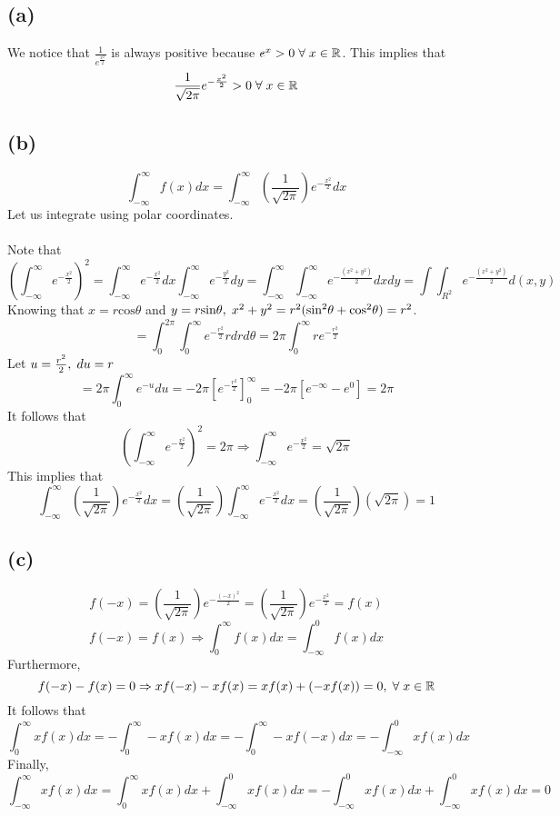 \documentclass[11pt]{article}
\begin{document}
\subsection*{(a)}
We notice that $\frac{1}{e^{\frac{x^2}{2}}}$ is always positive because $e^x>0\hspace{1mm}\forall\hspace{1mm}x\in\mathbb{R}$. This implies that
\[\frac{1}{\sqrt{2\pi}}e^{-\frac{x^2}{2}}>0\hspace{1mm}\forall\hspace{1mm}x\in\mathbb{R}\]
\subsection*{(b)}
\[\int_{-\infty}^{\infty}f(x)dx=\int_{-\infty}^{\infty}\left(\frac{1}{\sqrt{2\pi}}\right)e^{-\frac{x^2}{2}}dx\]
Let us integrate using polar coordinates. \\ \\
Note that
\[\left(\int_{-\infty}^{\infty}e^{-\frac{x^2}{2}}\right)^2=\int_{-\infty}^{\infty}e^{-\frac{x^2}{2}}dx\int_{-\infty}^{\infty}e^{-\frac{y^2}{2}}dy=\int_{-\infty}^{\infty}\int_{-\infty}^{\infty}e^{-\frac{(x^2+y^2)}{2}}dxdy=\int\int_{R^2}e^{-\frac{(x^2+y^2)}{2}}d(x,y)\]
Knowing that $x=r\text{cos}\theta$ and $y=r\text{sin}\theta,\hspace{1mm}x^2+y^2=r^2(\text{sin}^2\theta+\text{cos}^2\theta)=r^2$.
\[=\int_0^{2\pi}\int_0^{\infty}e^{-\frac{r^2}{2}}rdrd\theta=2\pi\int_0^{\infty}re^{-\frac{r^2}{2}}\]
Let $u=\frac{r^2}{2},\hspace{1mm}du=r$
\[=2\pi\int_0^{\infty}e^{-u}du=-2\pi\left[e^{-\frac{r^2}{2}}\right]_0^{\infty}=-2\pi\left[e^{-\infty}-e^0\right]=2\pi\]
It follows that 
\[\left(\int_{-\infty}^{\infty}e^{-\frac{x^2}{2}}\right)^2=2\pi\Rightarrow\int_{-\infty}^{\infty}e^{-\frac{x^2}{2}}=\sqrt{2\pi}\]
This implies that
\[\int_{-\infty}^{\infty}\left(\frac{1}{\sqrt{2\pi}}\right)e^{-\frac{x^2}{2}}dx=\left(\frac{1}{\sqrt{2\pi}}\right)\int_{-\infty}^{\infty}e^{-\frac{x^2}{2}}dx=\left(\frac{1}{\sqrt{2\pi}}\right)\left(\sqrt{2\pi}\right)=1\]
\subsection*{(c)}
\[f(-x)=\left(\frac{1}{\sqrt{2\pi}}\right)e^{-\frac{(-x)^2}{2}}=\left(\frac{1}{\sqrt{2\pi}}\right)e^{-\frac{x^2}{2}}=f(x)\]
\[f(-x)=f(x)\Rightarrow\int_0^{\infty}f(x)dx=\int_{-\infty}^0f(x)dx\]
Furthermore,
\[f(-x)-f(x)=0\Rightarrow xf(-x)-xf(x)=xf(x)+(-xf(x))=0,\hspace{1mm}\forall\hspace{1mm}x\in\mathbb{R}\]
It follows that
\[\int_0^{\infty}xf(x)dx=-\int_0^{\infty}-xf(x)dx=-\int_0^{\infty}-xf(-x)dx=-\int_{-\infty}^0xf(x)dx\]
Finally,
\[\int_{-\infty}^{\infty}xf(x)dx=\int_0^{\infty}xf(x)dx+\int_{-\infty}^0xf(x)dx=-\int_{-\infty}^0xf(x)dx+\int_{-\infty}^0xf(x)dx=0\]
\end{document}
